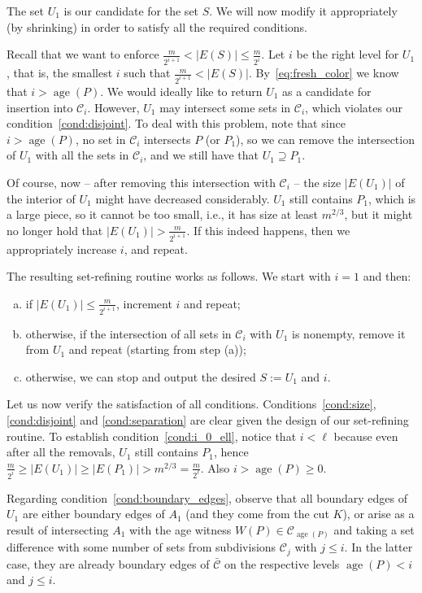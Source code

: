 \documentclass[11pt, letterpaper]{article}
\DeclareMathOperator{\age}{age}
\newcommand{\cC}{\mathcal{C}}
\newcommand{\ocC}{\bar{\mathcal{C}}}
\newcommand{\cut}{{K}}
\begin{document}
The set $U_1$ is our candidate for the set $S$. We will now modify it appropriately (by shrinking) in order to satisfy all the required conditions.

Recall that we want to enforce $\frac{m}{2^{i+1}} < |E(S)| \le \frac{m}{2^i}$. Let $i$ be the right level for $U_1$, that is, the smallest $i$ such that $\frac{m}{2^{i+1}} < |E(S)|$. By~\eqref{eq:fresh_color} we know that $i > \age(P)$. We would ideally like to return $U_1$ as a candidate for insertion into $\cC_i$. However, $U_1$ may intersect some sets in $\cC_i$, which violates our condition~\eqref{cond:disjoint}. To deal with this problem, note that since $i > \age(P)$, no set in $\cC_i$ intersects $P$ (or $P_1$), so we can remove the intersection of $U_1$ with all the sets in $\cC_i$, and we still have that $U_1 \supseteq P_1$. 

Of course, now -- after removing this intersection with $\cC_i$ -- the size $|E(U_1)|$ of the interior of $U_1$ might have decreased considerably. $U_1$ still contains $P_1$, which is a large piece, so it cannot be too small, i.e., it has size at least $m^{2/3}$, but it might no longer hold that $|E(U_1)| > \frac{m}{2^{i+1}}$. If this indeed happens, then we appropriately increase $i$, and repeat.

The resulting set-refining routine works as follows. We start with $i=1$ and then:
\begin{enumerate}[(a)]\addtolength{\itemsep}{-.3\baselineskip}
	\item if $|E(U_1)| \le \frac{m}{2^{i+1}}$, increment $i$ and repeat;
	\item otherwise, if the intersection of all sets in $\cC_i$ with $U_1$ is nonempty, remove it from $U_1$ and repeat (starting from step (a));
	\item otherwise, we can stop and output the desired $S := U_1$ and $i$.
\end{enumerate}

Let us now verify the satisfaction of all conditions. Conditions~\eqref{cond:size}, \eqref{cond:disjoint} and \eqref{cond:separation} are clear given the design of our set-refining routine. To establish condition~\eqref{cond:i_0_ell}, notice that $i < \ell$ because even after all the removals, $U_1$ still contains $P_1$, hence $\frac{m}{2^{i}} \ge |E(U_1)| \ge |E(P_1)| > m^{2/3} = \frac{m}{2^{\ell}}$. Also $i > \age(P) \ge 0$.

Regarding condition~\eqref{cond:boundary_edges}, observe that all boundary edges of $U_1$ are either boundary edges of $A_1$ (and they come from the cut $\cut$), or arise as a result of intersecting $A_1$ with the age witness $W(P) \in \cC_{\age(P)}$ and taking a set difference with some number of sets from subdivisions $\cC_j$ with $j \le i$. In the latter case, they are already boundary edges of $\ocC$ on the respective levels $\age(P) < i$ and $j \le i$.
\end{document}
